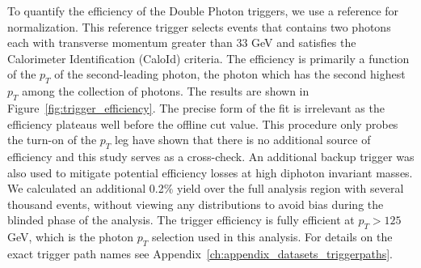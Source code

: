 

To quantify the efficiency of the Double Photon triggers, we use a reference for normalization. This reference trigger selects events that contains two photons each with transverse momentum greater than 33 GeV and satisfies the Calorimeter Identification (CaloId) criteria. The efficiency is primarily a function of the $p_{T}$ of the second-leading photon, the photon which has the second highest $p_{T}$ among the collection of photons. The results are shown in Figure~\ref{fig:trigger_efficiency}. The precise form of the fit is irrelevant as the efficiency plateaus well before the offline cut value. This procedure only probes the turn-on of the $p_{T}$ leg \cite{ref:AN2016_167} have shown that there is no additional source of efficiency and this study serves as a cross-check. An additional backup trigger was also used to mitigate potential efficiency losses at high diphoton invariant masses. We calculated an additional 0.2$\%$ yield over the full analysis region with several thousand events, without viewing any distributions to avoid bias during the blinded phase of the analysis. The trigger efficiency is fully efficient at $p_T > 125$ GeV, which is the photon $p_{T}$ selection used in this analysis. For details on the exact trigger path names see Appendix~\ref{ch:appendix_datasets_triggerpaths}.


